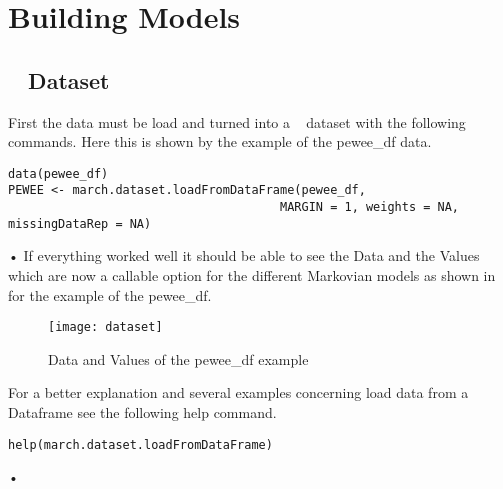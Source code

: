 \section{Building Models}
\subsection{\M~ Dataset}
First the data must be load and turned into a \M~ dataset with the following commands. Here this is shown by the example of the pewee\_df data. 
\begin{verbatim}
data(pewee_df)
PEWEE <- march.dataset.loadFromDataFrame(pewee_df, 
                    				  MARGIN = 1, weights = NA, missingDataRep = NA)
\end{verbatim}•
If everything worked well it should be able to see the Data and the Values which are now a callable option for the different Markovian models as shown in   for the example of the pewee\_df. 
\begin{figure}[h]
    \centering
    \texttt{[image: dataset]}
    \caption{Data and Values of the pewee\_df example}
    \label{fig:data}
\end{figure}
For a better explanation and several examples concerning load data from a Dataframe see the following help command. 
\begin{verbatim}
help(march.dataset.loadFromDataFrame)
\end{verbatim}•
